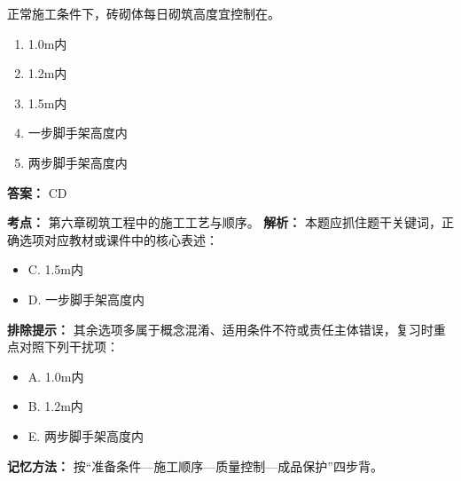 \documentclass[UTF8,fontset=fandol,11pt]{ctexart}
\begin{document}
\begin{quizbox}[title={第 26 题}]
正常施工条件下，砖砌体每日砌筑高度宜控制在。\\
\begin{enumerate}[label=\Alph*.]
\item 1.0m内
\item 1.2m内
\item 1.5m内
\item 一步脚手架高度内
\item 两步脚手架高度内
\end{enumerate}
\textbf{答案：} CD
\vspace{0.25em}
\begin{answerbox}[title={考点解析}]
\textbf{考点：} 第六章砌筑工程中的施工工艺与顺序。
\textbf{解析：} 本题应抓住题干关键词，正确选项对应教材或课件中的核心表述：
\begin{itemize}
\item C. 1.5m内
\item D. 一步脚手架高度内
\end{itemize}
\textbf{排除提示：} 其余选项多属于概念混淆、适用条件不符或责任主体错误，复习时重点对照下列干扰项：
\begin{itemize}
\item A. 1.0m内
\item B. 1.2m内
\item E. 两步脚手架高度内
\end{itemize}
\textbf{记忆方法：} 按“准备条件—施工顺序—质量控制—成品保护”四步背。
\end{answerbox}
\end{quizbox}

\vspace{0.2em}
\end{document}
